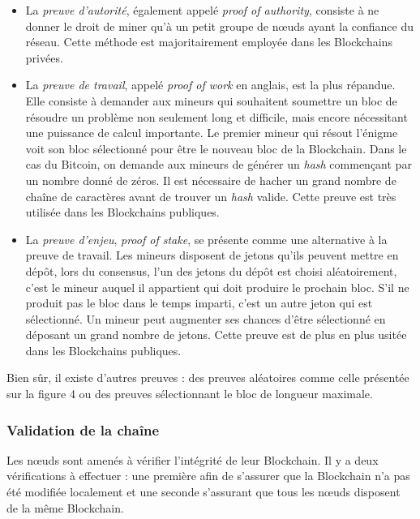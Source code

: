 \documentclass{article}
\newcommand{\noeuds}{n\oe uds }
\begin{document}
\begin{itemize}
    \item La \textit{preuve d'autorité}, également appelé \textit{proof of authority}, consiste à ne donner le droit de miner qu'à un petit groupe de \noeuds ayant la confiance du réseau. Cette méthode est majoritairement employée dans les Blockchains privées.
    \item La \textit{preuve de travail}, appelé \textit{proof of work} en anglais, est la plus répandue. Elle consiste à demander aux mineurs qui souhaitent soumettre un bloc de résoudre un problème non seulement long et difficile, mais encore nécessitant une puissance de calcul importante. Le premier mineur qui résout l'énigme voit son bloc sélectionné pour être le nouveau bloc de la Blockchain. Dans le cas du Bitcoin, on demande aux mineurs de générer un \textit{hash} commençant par un nombre donné de zéros. Il est nécessaire de hacher un grand nombre de chaîne de caractères avant de trouver un \textit{hash} valide. Cette preuve est très utilisée dans les Blockchains publiques.
    \item La \textit{preuve d'enjeu}, \textit{proof of stake}, se présente comme une alternative à la preuve de travail. Les mineurs disposent de jetons qu'ils peuvent mettre en dépôt, lors du consensus, l'un des jetons du dépôt est choisi aléatoirement, c'est le mineur auquel il appartient qui doit produire le prochain bloc. S'il ne produit pas le bloc dans le temps imparti, c'est un autre jeton qui est sélectionné. Un mineur peut augmenter ses chances d'être sélectionné en déposant un grand nombre de jetons. Cette preuve est de plus en plus usitée dans les Blockchains publiques.
\end{itemize}


Bien sûr, il existe d'autres preuves : des preuves aléatoires comme celle présentée sur la figure 4 ou des preuves sélectionnant le bloc de longueur maximale.

\subsubsection{Validation de la chaîne}


Les \noeuds sont amenés à vérifier l'intégrité de leur Blockchain. Il y a deux vérifications à effectuer : une première afin de s'assurer que la Blockchain n'a pas été modifiée localement et une seconde s'assurant que tous les \noeuds disposent de la même Blockchain.
\end{document}
